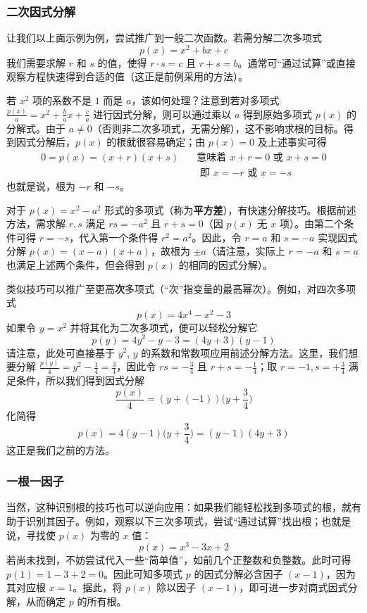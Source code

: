 \subsubsection*{二次因式分解}

让我们以上面示例为例，尝试推广到一般二次函数。若需分解二次多项式
\[p(x) = x^2 + bx + c\]
我们需要求解 $r$ 和 $s$ 的值，使得 $r \cdot s = c$ 且 $r + s = b$。通常可``通过试算''或直接观察方程快速得到合适的值（这正是前例采用的方法）。

若 $x^2$ 项的系数不是 $1$ 而是 $a$，该如何处理？注意到若对多项式 $\frac{p(x)}{a} = x^2 + \frac{b}{a}x + \frac{c}{a}$ 进行因式分解，则可以通过乘以 $a$ 得到原始多项式 $p(x)$ 的分解式。由于 $a \ne 0$（否则非二次多项式，无需分解），这不影响求根的目标。得到因式分解后，$p(x)$ 的根就很容易确定；由 $p(x) = 0$ 及上述事实可得
\begin{align*}
    0 = p(x) = (x + r)(x + s) & \quad \text{意味着\ } x + r = 0 \text{\ 或\ } x + s = 0 \\
    & \quad \text{ 即\ } x = -r \text{\ 或\ } x = -s
\end{align*}
也就是说，根为 $-r$ 和 $-s$。

对于 $p(x) = x^2 - a^2$ 形式的多项式（称为\textbf{平方差}），有快速分解技巧。根据前述方法，需求解 $r,s$ 满足 $rs = -a^2$ 且 $r + s = 0$（因 $p(x)$ 无 $x$ 项）。由第二个条件可得 $r = -s$，代入第一个条件得 $r^2 = a^2$。因此，令 $r = a$ 和 $s = -a$ 实现因式分解 $p(x) = (x - a)(x + a)$，故根为 $\pm a$（请注意，实际上 $r = -a$ 和 $s = a$ 也满足上述两个条件，但会得到 $p(x)$ 的相同的因式分解）。

类似技巧可以推广至更高\textbf{次}多项式（``次''指变量的最高幂次）。例如，对四次多项式
\[p(x) = 4x^4 - x^2 - 3\]
如果令 $y = x^2$ 并将其化为二次多项式，便可以轻松分解它
\[p(y) = 4y^2 - y - 3 = (4y + 3)(y - 1)\]
请注意，此处可直接基于 $y^2$, $y$ 的系数和常数项应用前述分解方法。这里，我们想要分解 $\frac{p(y)}{4} = y^2-\frac{1}{4}=\frac{3}{4}$，因此令 $rs = -\frac{3}{4}$ 且 $r + s =-\frac{1}{4}$；取 $r=-1, s=+\frac{3}{4}$ 满足条件，所以我们得到因式分解
\[\frac{p(x)}{4} = (y+(-1))\Big(y+\frac{3}{4}\Big)\]
化简得
\[p(x) = 4(y-1)\Big(y+\frac{3}{4}\Big) = (y-1)(4y+3)\]
这正是我们之前的方法。

\subsubsection*{一根一因子}

当然，这种识别根的技巧也可以逆向应用：如果我们能轻松找到多项式的根，就有助于识别其因子。例如，观察以下三次多项式，尝试``通过试算''找出根；也就是说，寻找使 $p(x)$ 为零的 $x$ 值：
\[p(x) = x^3 - 3x + 2\]
若尚未找到，不妨尝试代入一些``简单值''，如前几个正整数和负整数。此时可得 $p(1) = 1 - 3 + 2 = 0$。因此可知多项式 $p$ 的因式分解必含因子 $(x - 1)$，因为其对应根 $x = 1$。据此，将 $p(x)$ 除以因子 $(x - 1)$，即可进一步对商式因式分解，从而确定 $p$ 的所有根。

